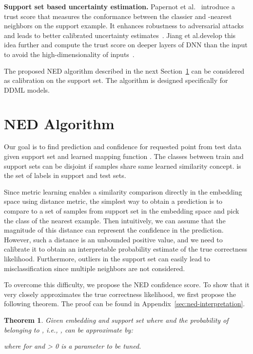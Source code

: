 \documentclass{article}
\newcommand{\ie}{{\it i.e.}}
\newtheorem{theorem}{Theorem}
\begin{document}
\textbf{Support set based uncertainty estimation.}  Papernot et al.~\cite{b20} introduce a trust score that measures the conformance between the classier and -nearest neighbors on the support example. It enhances robustness to adversarial attacks and leads to better calibrated uncertainty estimates~\cite{b7}. Jiang et al.develop this idea further and compute the trust score on deeper layers of DNN than the input to avoid the high-dimensionality of inputs~\cite{trust_or_not}.

The proposed NED algorithm described in the next Section~\ref{sec:ned-section} can be considered as calibration on the support set. The algorithm is designed specifically for DDML models.

\section{NED Algorithm}
\label{sec:ned-section}
Our goal is to find prediction  and confidence  for requested point  from test data given support set  and learned mapping function .  The classes between train and support sets can be disjoint if samples share same learned similarity concept.   is the set of  labels in support and test sets.

Since metric learning enables a similarity comparison directly in the embedding space using distance metric,
the simplest way to obtain a prediction  is to compare  to a set of samples from support set in the embedding space and pick the class of the nearest example. Then intuitively, we can assume that the magnitude of this distance can represent the confidence in the prediction.
However, such a distance is an unbounded positive value, and we need to calibrate it to obtain an interpretable probability estimate of the true correctness likelihood. Furthermore, outliers  in the support set can easily lead to misclassification since multiple neighbors are not considered.

To overcome this difficulty, we propose the NED confidence score. To show that it very closely approximates the true correctness likelihood,
we first propose the following theorem.
The proof can be found in Appendix~\ref{sec:ned-interpretation}.

\begin{theorem}
\label{theorem}
Given embedding  and support set 
where  and 
the probability  of  belonging to ,
\ie, , can be approximate by:

where  for  and
 > 0 is a parameter to be tuned.
\end{theorem}
\addtocounter{theorem}{-1}
\end{document}
